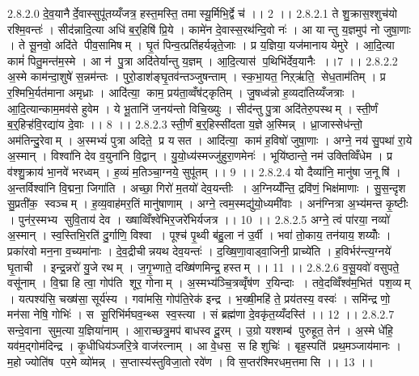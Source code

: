 2.8.2.0
दे॒व॒यानैर्दे॒वास्सुपू॑तय्यँजत्र॒ हस्त॒मस्ति॒ तमा॑स्यू॒र्मिभि॒र्द्वे च॑ ।। 2 ।।
2.8.2.1
ते शु॒क्रास॒श्शुच॑यो रश्मि॒वन्तः॑ । सीद॑न्नादि॒त्या अधि॑ ब॒र्॒हिषि॑ प्रि॒ये । कामे॑न दे॒वास्स॒रथ॑न्दि॒वो नः॑ । आ यान्तु य॒ज्ञमुप॑ नो जुषा॒णाः । ते सू॒नवो॒ अदि॑ते पीव॒सामिषम् । घृ॒तं पिन्व॒त्प्रति॑हर्यन्नृते॒जाः । प्र य॒ज्ञिया॒ यज॑मानाय येमुरे । आ॒दि॒त्या कामं॑ पितु॒मन्त॑म॒स्मे । आ न॑ पु॒त्रा अदि॑तेर्यान्तु य॒ज्ञम् । आ॒दि॒त्यास॑ प॒थिभि॑र्देव॒यानैः ।।7 ।।
2.8.2.2
अ॒स्मे काम॑न्दा॒शुषे॑ स॒न्नम॑न्तः । पुरो॒डाश॑ङ्घृ॒तव॑न्तञ्जुषन्ताम् । स्क॒भा॒यत॒ निऱ्ऋ॑ति॒॒ सेध॒ताम॑तिम् । प्र र॒श्मिभि॒र्यत॑माना अमृध्राः । आदि॑त्या॒ काम॒ प्रय॑ता॒व्वँष॑ट्कृतिम् । जु॒षध्व॑न्नो ह॒व्यदा॑तिय्यँजत्राः । आ॒दि॒त्यान्काम॒मव॑से हुवेम । ये भू॒तानि॑ ज॒नय॑न्तो विचि॒ख्युः । सीद॑न्तु पु॒त्रा अदि॑तेरु॒पस्थम् । स्ती॒र्णं ब॒र्॒हिऱ्ह॑वि॒रद्या॑य दे॒वाः ।। 8 ।।
2.8.2.3
स्ती॒र्णं ब॒र्॒हिस्सी॑दता य॒ज्ञे अ॒स्मिन्न् । ध्रा॒जास्सेध॑न्तो॒ अम॑तिन्दु॒रेवाम् । अ॒स्मभ्यं॑ पुत्रा अदिते॒ प्र य॑सत । आदि॑त्या॒ काम॑ ह॒विषो॑ जुषा॒णाः । अग्ने॒ नय॑ सु॒पथा॑ रा॒ये अ॒स्मान् । विश्वा॑नि देव व॒युना॑नि वि॒द्वान् । यु॒यो॒ध्य॑स्मज्जु॑हुरा॒णमेनः॑ । भूयि॑ष्ठान्ते॒ नम॑ उक्तिव्विँधेम । प्र व॑श्शु॒क्राय॑ भा॒नवे॑ भरध्वम् । ह॒व्यं म॒तिञ्चा॒ग्नये॒ सुपू॑तम् ।। 9 ।।
2.8.2.4
यो दैव्या॑नि॒ मानु॑षा ज॒नूषि॑ । अ॒न्तर्विश्वा॑नि वि॒द्मना॒ जिगा॑ति । अच्छा॒ गिरो॑ म॒तयो॑ देव॒यन्तीः । अ॒ग्निय्यँ॑न्ति॒ द्रवि॑णं॒ भिक्ष॑माणाः । सु॒स॒न्दृश॑ सु॒प्रती॑क॒॒ स्वञ्चम् । ह॒व्य॒वाह॑मर॒तिं मानु॑षाणाम् । अग्ने॒ त्वम॒स्मद्यु॑यो॒ध्यमी॑वाः । अन॑ग्नित्रा अ॒भ्य॑मन्त कृ॒ष्टीः । पुन॑र॒स्मभ्य॑ सुवि॒ताय॑ देव । ख्षाव्विँश्वे॑भिर॒जरे॑भिर्यजत्र ।। 10 ।।
2.8.2.5
अग्ने॒ त्वं पा॑रया॒ नव्यो॑ अ॒स्मान् । स्व॒स्तिभि॒रति॑ दु॒र्गाणि॒ विश्वा । पूश्च॑ पृ॒थ्वी ब॑हु॒ला न॑ उ॒र्वी । भवा॑ तो॒काय॒ तन॑याय॒ शय्योँः । प्रका॑रवो मन॒ना व॒च्यमा॑नाः । दे॒व॒द्रीचीन्नयथ देव॒यन्तः॑ । द॒ख्षि॒णा॒वाड्वा॒जिनी॒ प्राच्ये॑ति । ह॒विर्भर॑न्त्य॒ग्नये॑ घृ॒ताची । इन्द्र॒न्नरो॑ यु॒जे रथम् । ज॒गृ॒भ्णाते॒ दख्षि॑णमिन्द्र॒ हस्तम् ।। 11 ।।
2.8.2.6
व॒सू॒यवो॑ वसुपते॒ वसू॑नाम् । वि॒द्मा हि त्वा॒ गोप॑ति शूर॒ गोनाम् । अ॒स्मभ्य॑ञ्चि॒त्रव्वृँष॑ण र॒यिन्दाः । तवे॒दव्विँश्व॑म॒भित॑ पश॒व्यम् । यत्पश्य॑सि॒ चख्ष॑सा॒ सूर्य॑स्य । गवा॑मसि॒ गोप॑ति॒रेक॑ इन्द्र । भ॒ख्षी॒महि॑ ते॒ प्रय॑तस्य॒ वस्वः॑ । समि॑न्द्र णो॒ मन॑सा नेषि॒ गोभिः॑ । स सू॒रिभि॑र्मघव॒न्थ्स स्व॒स्त्या । सं ब्रह्म॑णा दे॒वकृ॑त॒य्यँदस्ति॑ ।। 12 ।।
2.8.2.7
सन्दे॒वाना॑ सुम॒त्या य॒ज्ञिया॑नाम् । आ॒राच्छत्रु॒मप॑ बाधस्व दू॒रम् । उ॒ग्रो यश्शम्ब॑ पुरुहूत॒ तेन॑ । अ॒स्मे धे॑हि॒ यव॑म॒द्गोम॑दिन्द्र । कृ॒धीधिय॑ञ्जरि॒त्रे वाज॑रत्नाम् । आ वे॒धस॒॒ स हि शुचिः॑ । बृह॒स्पति॑ प्रथ॒मञ्जाय॑मानः । म॒हो ज्योति॑ष पर॒मे व्यो॑मन्न् । स॒प्तास्य॑स्तुविजा॒तो रवे॑ण । वि स॒प्तर॑श्मिरधम॒त्तमा॑सि ।। 13 ।।
